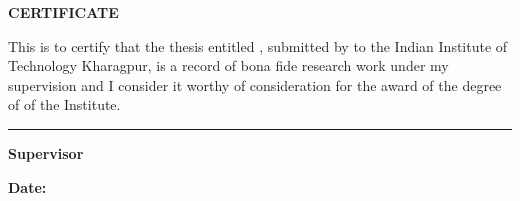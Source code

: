 \begin{center}
{\Large {\bf \uppercase{Certificate}}}
\end{center}
\thispagestyle{plain}
\noindent This is to certify that the thesis entitled {\bf \mytitle}, submitted by {\bf \myname} to the Indian Institute of Technology Kharagpur, is a record of bona fide research work under my supervision and I consider it worthy of consideration for the award of the degree of {\bf \mydegree} of the Institute. 
\vspace{3\baselineskip}
\begin{flushright}
\begin{minipage}[c]{0.4\textwidth}
\centering
\hrule 
\vspace{0.5\baselineskip}
{\Large \bf Supervisor} \\
\end{minipage}
\end{flushright}
\vspace{\baselineskip}

{\large \bf Date: }
